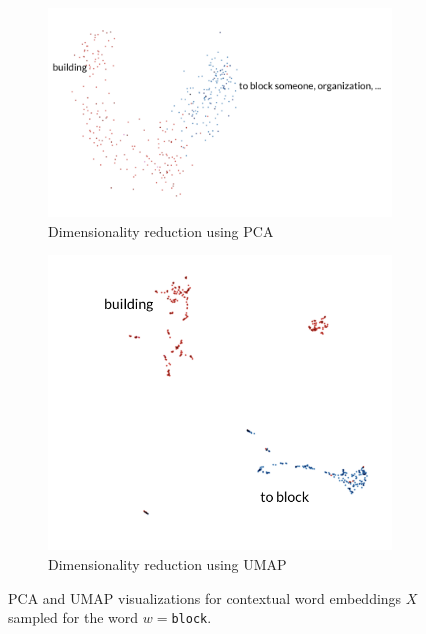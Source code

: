 \documentclass[a4paper,12pt,oneside,openright]{report}
\begin{document}
\begin{figure}[H]
\begin{subfigure}{.45\textwidth}
  \centering
  \includegraphics[width=.8\linewidth]{./assets/analysis/block_pca.png}
  \caption{Dimensionality reduction using PCA}
  \label{fig:sfig1}
\end{subfigure}%
\hfill
\begin{subfigure}{.45\textwidth}
  \centering
  \includegraphics[width=.8\linewidth]{./assets/analysis/block_umap.png}
  \caption{Dimensionality reduction using UMAP}
  \label{fig:sfig2}
\end{subfigure}
\caption{PCA and UMAP visualizations for contextual word embeddings $X$ sampled for the word $w=$\texttt{block}. }
\label{fig:was_tensorboard}
\end{figure}
\end{document}
